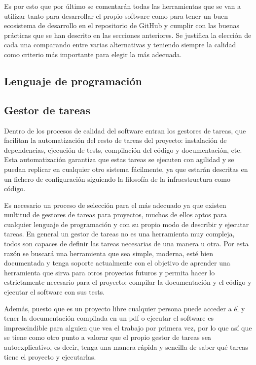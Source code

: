 Es por esto que por último se comentarán todas las herramientas que se van a
utilizar tanto para desarrollar el propio software como para tener un buen
ecosistema de desarrollo en el repositorio de GitHub y cumplir con las buenas
prácticas que se han descrito en las secciones anteriores. Se justifica la
elección de cada una comparando entre varias alternativas y teniendo siempre la
calidad como criterio más importante para elegir la más adecuada.

\subsection{Lenguaje de programación}

\subsection{Gestor de tareas}
Dentro de los procesos de calidad del software entran los gestores de tareas,
que facilitan la automatización del resto de tareas del proyecto: instalación de
dependencias, ejecución de tests, compilación del código y documentación, etc.
Esta automatización garantiza que estas tareas se ejecuten con agilidad y se
puedan replicar en cualquier otro sistema fácilmente, ya que estarán descritas
en un fichero de configuración siguiendo la filosofía de la infraestructura como
código.

Es necesario un proceso de selección para el más adecuado ya que existen
multitud de gestores de tareas para proyectos, muchos de ellos aptos para
cualquier lenguaje de programación y con su propio modo de describir y ejecutar
tareas. En general un gestor de tareas no es una herramienta muy compleja, todos
son capaces de definir las tareas necesarias de una manera u otra. Por esta
razón se buscará una herramienta que sea simple, moderna, esté bien documentada
y tenga soporte actualmente con el objetivo de aprender una herramienta que
sirva para otros proyectos futuros y permita hacer lo estrictamente necesario
para el proyecto: compilar la documentación y el código y ejecutar el software
con sus tests. 

Además, puesto que es un proyecto libre cualquier persona puede acceder a él y
tener la documentación compilada en un pdf o ejecutar el software es
imprescindible para alguien que vea el trabajo por primera vez, por lo que así
que se tiene como otro punto a valorar que el propio gestor de tareas sea
autoexplicativo, es decir, tenga una manera rápida y sencilla de saber qué
tareas tiene el proyecto y ejecutarlas.

